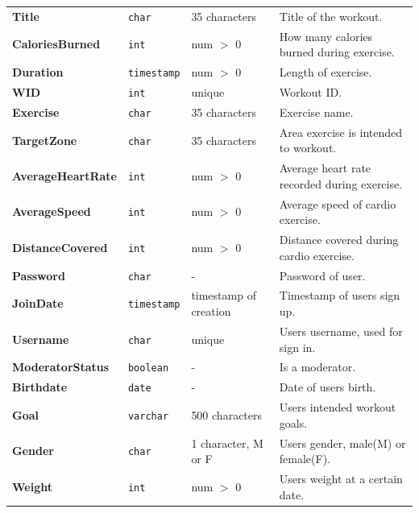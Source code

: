 \documentclass{article}
\begin{document}
\begin{adjustwidth}{-2.25cm}{}
\begin{center}
\begin{tabular}{l|lll}
        \textbf{Title}            & \texttt{char}      & 35 characters         & Title of the workout.  \\
        \textbf{CaloriesBurned}   & \texttt{int}       & num $>$ 0             & How many calories burned during exercise.  \\ \midrule
        \textbf{Duration}         & \texttt{timestamp} & num $>$ 0             & Length of exercise.  \\
        \textbf{WID}              & \texttt{int}       & unique                & Workout ID.  \\
        \textbf{Exercise}         & \texttt{char}      & 35 characters         & Exercise name.  \\
        \textbf{TargetZone}       & \texttt{char}      & 35 characters         & Area exercise is intended to workout.  \\ \midrule
        \textbf{AverageHeartRate} & \texttt{int}       & num $>$ 0             & Average heart rate recorded during exercise.  \\
        \textbf{AverageSpeed}     & \texttt{int}       & num $>$ 0             & Average speed of cardio exercise.  \\
        \textbf{DistanceCovered}  & \texttt{int}       & num $>$ 0             & Distance covered during cardio exercise.  \\
        \textbf{Password}         & \texttt{char}      & -                     & Password of user.  \\ \midrule
        \textbf{JoinDate}         & \texttt{timestamp} & timestamp of creation & Timestamp of users sign up.  \\
        \textbf{Username}         & \texttt{char}      & unique                & Users username, used for sign in.  \\
        \textbf{ModeratorStatus}  & \texttt{boolean}   & -                     & Is a moderator.  \\
        \textbf{Birthdate}        & \texttt{date}      & -                     & Date of users birth.  \\ \midrule
        \textbf{Goal}             & \texttt{varchar}   & 500 characters        & Users intended workout goals.  \\
        \textbf{Gender}           & \texttt{char}      & 1 character, M or F   & Users gender, male(M) or female(F).  \\
        \textbf{Weight}           & \texttt{int}       & num $>$ 0             & Users weight at a certain date.  \\

\end{tabular}
\end{center}
\end{adjustwidth}
\end{document}
